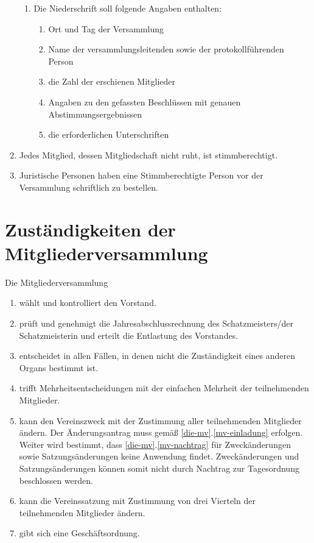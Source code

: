 \documentclass[a4paper, 12pt]{scrartcl}
\begin{document}
\begin{enumerate}
\begin{enumerate}
			\item Die Niederschrift soll folgende Angaben enthalten:
			\begin{enumerate}
	  		\item Ort und Tag der Versammlung
	    	\item Name der versammlungsleitenden sowie der protokollführenden Person
	    	\item die Zahl der erschienen Mitglieder
	    	\item Angaben zu den gefassten Beschlüssen mit genauen Abstimmungsergebnissen
	    	\item die erforderlichen Unterschriften
			\end{enumerate}
		\end{enumerate}
	\item Jedes Mitglied, dessen Mitgliedschaft nicht ruht, ist stimmberechtigt.
	\item Juristische Personen haben eine Stimmberechtigte Person vor der Versammlung schriftlich zu bestellen.
\end{enumerate}

\section{Zuständigkeiten der Mitgliederversammlung}
Die Mitgliederversammlung
\begin{enumerate}
	\item wählt und kontrolliert den Vorstand.
	\item prüft und genehmigt die Jahresabschlussrechnung des Schatzmeisters/der Schatzmeisterin und erteilt die Entlastung des Vorstandes.
	\item entscheidet in allen Fällen, in denen nicht die Zuständigkeit eines anderen Organs bestimmt ist.
	\item trifft Mehrheitsentscheidungen mit der einfachen Mehrheit der teilnehmenden Mitglieder.
	\item kann den Vereinszweck mit der Zustimmung aller teilnehmenden
    Mitglieder ändern. Der Änderungsantrag muss gemäß
    \ref{die-mv}.\ref{mv-einladung} erfolgen. Weiter wird bestimmt, dass
    \ref{die-mv}.\ref{mv-nachtrag} für Zweckänderungen sowie
    Satzungsänderungen keine Anwendung findet. Zweckänderungen und
    Satzungsänderungen können somit nicht durch Nachtrag zur Tagesordnung beschlossen werden.
	\item kann die Vereinssatzung mit Zustimmung von drei Vierteln der teilnehmenden Mitglieder ändern. 
	\item gibt sich eine Geschäftsordnung.
\end{enumerate}
\end{document}
